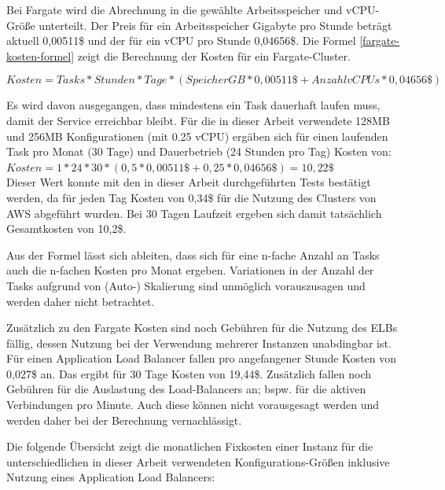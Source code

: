 Bei Fargate wird die Abrechnung in die gewählte Arbeitsspeicher und \ac{vCPU}-Größe unterteilt. Der Preis für ein Arbeitsspeicher Gigabyte pro Stunde beträgt aktuell 0,00511\$ und der für ein \ac{vCPU} pro Stunde 0,04656\$\cite{noauthor_aws_nodate-2}. Die Formel \ref{fargate-kosten-formel} zeigt die Berechnung der Kosten für ein Fargate-Cluster.


\begin{equation}
Kosten = Tasks * Stunden * Tage * (SpeicherGB * 0,00511\$ + AnzahlvCPUs * 0,04656\$)
\label{fargate-kosten-formel}
\end{equation}

Es wird davon ausgegangen, dass mindestens ein Task dauerhaft laufen muss, damit der Service erreichbar bleibt. Für die in dieser Arbeit verwendete 128MB und 256MB Konfigurationen (mit 0.25 \ac{vCPU}) ergäben sich für einen laufenden Task pro Monat (30 Tage) und Dauerbetrieb (24 Stunden pro Tag) Kosten von: \\

$Kosten = 1 * 24 * 30 * (0,5 * 0,00511\$ + 0,25 * 0,04656\$) = 10,22\$$ \\

Dieser Wert konnte mit den in dieser Arbeit durchgeführten Tests bestätigt werden, da für jeden Tag Kosten von 0,34\$ für die Nutzung des Clusters von \ac{AWS} abgeführt wurden. Bei 30 Tagen Laufzeit ergeben sich damit tatsächlich Gesamtkosten von 10,2\$.

Aus der Formel lässt sich ableiten, dass sich für eine n-fache Anzahl an Tasks auch die n-fachen Kosten pro Monat ergeben. Variationen in der Anzahl der Tasks aufgrund von (Auto-) Skalierung sind unmöglich vorauszusagen und werden daher nicht betrachtet.

Zusätzlich zu den Fargate Kosten sind noch Gebühren für die Nutzung des \acp{ELB} fällig, dessen Nutzung bei der Verwendung mehrerer Instanzen unabdingbar ist. Für einen Application Load Balancer fallen pro angefangener Stunde Kosten von 0,027\$ an. Das ergibt für 30 Tage Kosten von 19,44\$. Zusätzlich fallen noch Gebühren für die Auslastung des Load-Balancers an; bspw. für die aktiven Verbindungen pro Minute\cite{noauthor_preise_nodate}. Auch diese können nicht vorausgesagt werden und werden daher bei der Berechnung vernachlässigt.

Die folgende Übersicht zeigt die monatlichen Fixkosten einer Instanz für die unterschiedlichen in dieser Arbeit verwendeten Konfigurations-Größen inklusive Nutzung eines Application Load Balancers:

